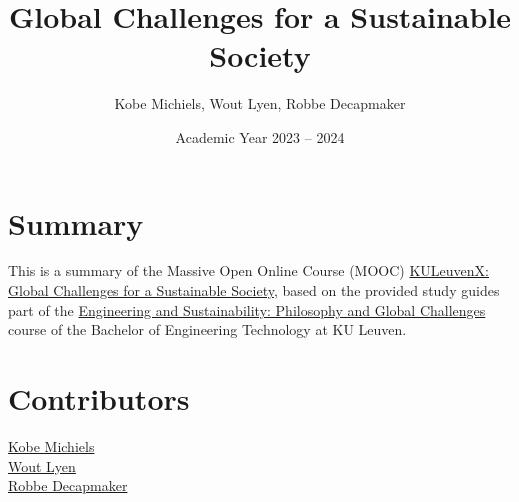 \documentclass[kul]{kulakarticle} %
\title{Global Challenges for a Sustainable Society}
\author{Kobe Michiels, Wout Lyen, Robbe Decapmaker}
\date{Academic Year 2023 -- 2024}
\begin{document}
\maketitle

\section*{Summary}

This is a summary of the Massive Open Online Course (MOOC) \href{https://www.edx.org/learn/science/ku-leuven-global-challenges-for-a-sustainable-society?webview=false&campaign=Global+Challenges+for+a+Sustainable+Society&source=edx&product_category=course&placement_url=https%3A%2F%2Fwww.edx.org%2Fschool%2Fkuleuvenx}{KULeuvenX: Global Challenges for a Sustainable Society}, based on the provided study guides part of the \href{https://onderwijsaanbod.kuleuven.be/syllabi/v/e/T3AID1E.htm#activetab=inhoud_idp1690064}{Engineering and Sustainability: Philosophy and Global Challenges} course of the Bachelor of Engineering Technology at KU Leuven.

\section*{Contributors}
\href{https://github.com/michielskobe}{Kobe Michiels}\\
\href{https://github.com/woutlyen}{Wout Lyen}\\
\href{https://github.com/debber1}{Robbe Decapmaker}
\end{document}
